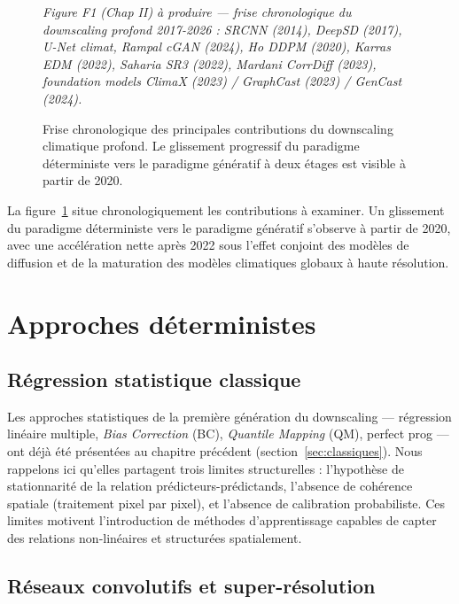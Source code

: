 \documentclass[14pt,a4paper,openany]{extreport}
\theoremstyle{definition}
\newcommand{\figplaceholder}[2][0.9\linewidth]{%
  \begin{tcolorbox}[width=#1,height=5cm,valign=center,colback=gray!8,colframe=gray!45,arc=2pt,boxrule=0.5pt]
    \centering\small\textit{#2}
  \end{tcolorbox}%
}
\begin{document}
\begin{figure}[ht]
  \centering
  \figplaceholder{Figure F1 (Chap II) à produire --- frise chronologique du downscaling profond 2017-2026 : SRCNN (2014), DeepSD (2017), U-Net climat, Rampal cGAN (2024), Ho DDPM (2020), Karras EDM (2022), Saharia SR3 (2022), Mardani CorrDiff (2023), foundation models ClimaX (2023) / GraphCast (2023) / GenCast (2024).}
  \caption{Frise chronologique des principales contributions du downscaling climatique profond. Le glissement progressif du paradigme déterministe vers le paradigme génératif à deux étages est visible à partir de 2020.}
  \label{fig:frise}
\end{figure}

La figure~\ref{fig:frise} situe chronologiquement les contributions à examiner. Un glissement du paradigme déterministe vers le paradigme génératif s'observe à partir de 2020, avec une accélération nette après 2022 sous l'effet conjoint des modèles de diffusion et de la maturation des modèles climatiques globaux à haute résolution.

\section{Approches déterministes}
\label{sec:soa-det}

\subsection{Régression statistique classique}
\label{ssec:soa-reg-classique}

Les approches statistiques de la première génération du downscaling --- régression linéaire multiple, \emph{Bias Correction} (BC), \emph{Quantile Mapping} (QM), perfect prog --- ont déjà été présentées au chapitre précédent (section~\ref{sec:classiques}). Nous rappelons ici qu'elles partagent trois limites structurelles : l'hypothèse de stationnarité de la relation prédicteurs-prédictands, l'absence de cohérence spatiale (traitement pixel par pixel), et l'absence de calibration probabiliste. Ces limites motivent l'introduction de méthodes d'apprentissage capables de capter des relations non-linéaires et structurées spatialement.

\subsection{Réseaux convolutifs et super-résolution}
\label{ssec:soa-cnn}
\end{document}
